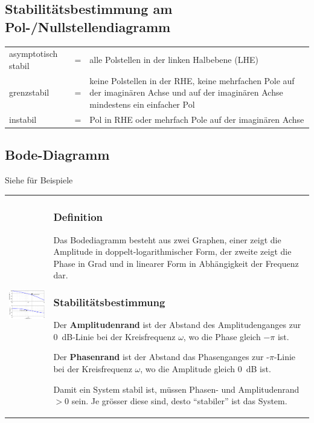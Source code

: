 \subsection{Stabilitätsbestimmung am Pol-/Nullstellendiagramm}
\begin{tabular}{lcp{13cm}}
	asymptotisch stabil & = & alle Polstellen in der linken Halbebene (LHE) \\
	grenzstabil & = & keine Polstellen in der RHE, keine mehrfachen Pole auf der imaginären 
  Achse und auf der imaginären Achse mindestens ein einfacher Pol\\
  instabil & = & Pol in RHE oder mehrfach Pole auf der imaginären Achse
\end{tabular}

\subsection{Bode-Diagramm  }
Siehe  für Beispiele\\
\begin{tabular}{ll}
	\parbox{7cm}{
		\includegraphics[width=7cm]{./images/bode-stabilitaet.png}
	}
	& \parbox{11cm}{
		\subsubsection{Definition}
		Das Bodediagramm besteht aus zwei Graphen, einer zeigt die Amplitude in
		doppelt-logarithmischer Form, der zweite zeigt die Phase in Grad und in
		linearer Form in Abhängigkeit der Frequenz dar.
		
		\subsubsection{Stabilitätsbestimmung  }
		Der {\bf Amplitudenrand} ist der Abstand des
		Amplitudenganges zur 0~dB-Linie bei der Kreisfrequenz $\omega$, wo die Phase
		gleich $-\pi$ ist. \\
		
		Der {\bf Phasenrand} ist der Abstand das Phasenganges zur
		-$\pi$-Linie bei der Kreisfrequenz $\omega$, wo die Amplitude gleich 0~dB
		ist. \\
		
		Damit ein System stabil ist, m\"ussen Phasen- und Amplitudenrand
		$>0$ sein. Je gr\"osser diese sind, desto ``stabiler'' ist das System.
	}
\end{tabular}

